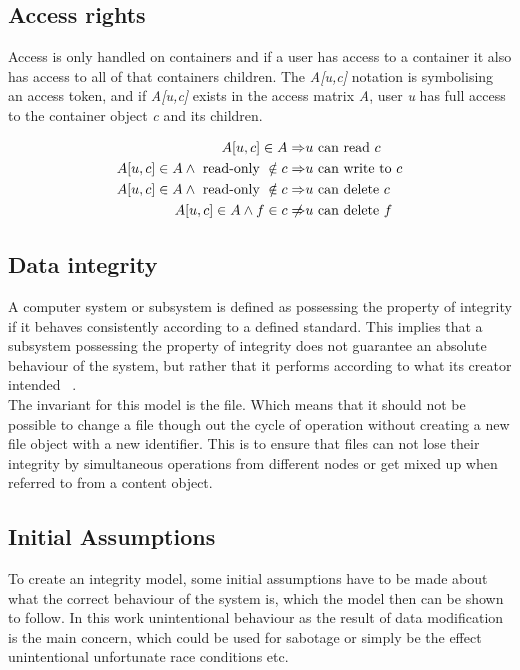 \documentclass[a4paper,12pt]{article}
\begin{document}
\subsection{Access rights}
Access is only handled on containers and if a user has access to a container it also has access to
all of that containers children.
The \textit{A[u,c]} notation is symbolising an access token, and if \textit{A[u,c]} exists in
the access matrix \textit{A}, user \textit{u} has full access to the container object \textit{c} and
its children.

\begin{equation}
    \begin{split}
        A[u,c] \in A \Rightarrow & u \text{ can read } c \\
        A[u,c] \in A \land \text{ read-only } \notin c \Rightarrow & u \text{ can write to } c \\
        A[u,c] \in A \land \text{ read-only } \notin c \Rightarrow & u \text{ can delete } c \\
        A[u,c] \in A \land f \in c \centernot\Rightarrow & u \text{ can delete } f 
    \end{split}
\end{equation}

\subsection{Data integrity}
A computer system or subsystem is defined as possessing the property of integrity if it behaves consistently
according to a defined standard. This implies that a subsystem possessing the property of integrity
does not guarantee an absolute behaviour of the system, but rather that it performs according to
what its creator intended ~\cite{BIBA}.
\\
The invariant for this model is the file. Which means that it should not be possible to
change a file though out the cycle of operation without creating a new file object with a new
identifier. This is to ensure that files can not lose their integrity by simultaneous
operations from different nodes or get mixed up when referred to from a content object. 

\subsection{Initial Assumptions}
To create an integrity model, some initial assumptions have to be made about what the correct
behaviour of the system is, which the model then can be shown to follow. In this work unintentional
behaviour as the result of data modification is the main concern, which could be used for sabotage
or simply be the effect unintentional unfortunate race conditions etc. 
\end{document}
